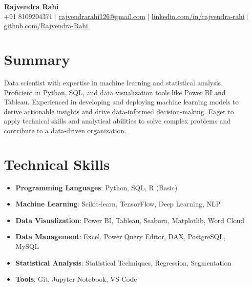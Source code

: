 \documentclass[letterpaper,10pt]{article}
\newcommand{\resumeItem}[1]{\item\small{#1}}
\newcommand{\resumeSubHeadingList}{\begin{itemize}[leftmargin=0.15in, label={}]}
\newcommand{\resumeSubHeadingListEnd}{\end{itemize}}
\begin{document}
\begin{center}
  \textbf{\Huge Rajvendra Rahi} \\
  \small +91 8109204371 $|$ \href{mailto:rajvendrarahi126@gmail.com}{rajvendrarahi126@gmail.com} $|$ 
  \href{https://linkedin.com/in/rajvendra-rahi}{linkedin.com/in/rajvendra-rahi} $|$ 
  \href{https://github.com/Rajvendra-Rahi}{github.com/Rajvendra-Rahi}
\end{center}

\section*{Summary}
Data scientist with expertise in machine learning and statistical analysis. Proficient in Python, SQL, and data visualization tools like Power BI and Tableau. Experienced in developing and deploying machine learning models to derive actionable insights and drive data-informed decision-making. Eager to apply technical skills and analytical abilities to solve complex problems and contribute to a data-driven organization.

\section{Technical Skills}
\resumeSubHeadingList
  \resumeItem{\textbf{Programming Languages}: Python, SQL, R (Basic)}
  \resumeItem{\textbf{Machine Learning}: Scikit-learn, TensorFlow, Deep Learning, NLP}
  \resumeItem{\textbf{Data Visualization}: Power BI, Tableau, Seaborn, Matplotlib, Word Cloud}
  \resumeItem{\textbf{Data Management}: Excel, Power Query Editor, DAX, PostgreSQL, MySQL}
  \resumeItem{\textbf{Statistical Analysis}: Statistical Techniques, Regression, Segmentation}
  \resumeItem{\textbf{Tools}: Git, Jupyter Notebook, VS Code}
\resumeSubHeadingListEnd
\end{document}
